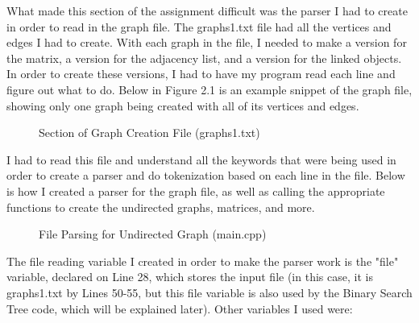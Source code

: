 \documentclass[letterpaper, 10pt]{article}
\begin{document}
\vspace{1em}

\noindent
What made this section of the assignment difficult was the parser I had to create in order to read in the graph file. The graphs1.txt file had all the vertices and edges I had to create. With each graph in the file, I needed to make a version for the matrix, a version for the adjacency list, and a version for the linked objects. In order to create these versions, I had to have my program read each line and figure out what to do. Below in Figure 2.1 is an example snippet of the graph file, showing only one graph being created with all of its vertices and edges.

\begin{figure}[H]
  \centering
   
  \caption{Section of Graph Creation File (graphs1.txt)}
  \label{fig:figure2.1}
\end{figure}

\noindent
I had to read this file and understand all the keywords that were being used in order to create a parser and do tokenization based on each line in the file. Below is how I created a parser for the graph file, as well as calling the appropriate functions to create the undirected graphs, matrices, and more.

\begin{figure}[H]
  \centering
   
  \label{fig:figure2.2-part1}
\end{figure}

\begin{figure}[H]
  \centering
   
  \label{fig:figure2.2-part2}
\end{figure}

\begin{figure}[H]
  \centering
   
  \label{fig:figure2.2-part3}
\end{figure}

\begin{figure}[H]
  \centering
   
  \caption{File Parsing for Undirected Graph (main.cpp)}
  \label{fig:figure2.2-part4}
\end{figure}

\noindent
The file reading variable I created in order to make the parser work is the "file" variable, declared on Line 28, which stores the input file (in this case, it is graphs1.txt by Lines 50-55, but this file variable is also used by the Binary Search Tree code, which will be explained later). Other variables I used were:
\end{document}
